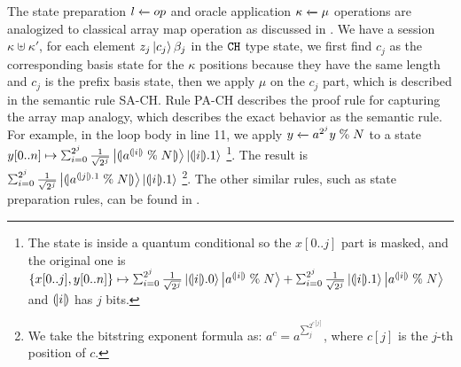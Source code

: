 \label{sec:oracle-state}
The \qafny state preparation ${l} \xleftarrow{} {op}$ and oracle application ${\kappa} \xleftarrow{} {\mu}$ operations
are analogized to classical array map operation as discussed in . We have a session $\kappa\uplus \kappa'$, for each element $z_j\left\vert{c_{j}}\right\rangle{\beta_j}$ in the $\texttt{CH}$ type state, we first find $c_{j}$ as the corresponding basis state for the $\kappa$ positions because they have the same length and $c_j$ is the prefix basis state, then we apply $\mu$ on the $c_{j}$ part, which is described in the semantic rule \textsc{SA-CH}. Rule \textsc{PA-CH} describes the proof rule for capturing the array map analogy, which describes the exact behavior as the semantic rule.
For example, in the loop body in  line 11, we apply ${y} \xleftarrow{} {a^{2^j}y\;\%\; N}$ to a state $y[0..n] \mapsto \schai{2^{j}}{\frac{1}{\sqrt{2^{j}}}}{\tos{a^{\tos{i}}\;\%\;N}}{\ket{\tos{i}.1}}$ 
\footnote{The state is inside a quantum conditional so the $x[0..j]$ part is masked, and the original one is $\{x[0..j],y[0..n]\} \mapsto \schai{2^{j}}{\frac{1}{\sqrt{2^{j}}}}{\tos{i}.0}{\ket{a^{\tos{i}}\;\%\;N}}+
\schai{2^{j}}{\frac{1}{\sqrt{2^{j}}}}{\tos{i}.1}{\ket{a^{\tos{i}}\;\%\;N}}$ and $(\!| i |\!)$ has $j$ bits. }. 
The result is $\schai{2^{j}}{\frac{1}{\sqrt{2^{j}}}}{\tos{a^{\tos{j}.1}\;\%\;N}}{\ket{\tos{i}.1}}$ 
\footnote{We take the bitstring exponent formula as: $a^{c}= a^{\sum_{j}^{2^{c[j]}}}$, where $c[j]$ is the $j$-th position of $c$. }.
The other similar rules, such as state preparation rules, can be found in . 

